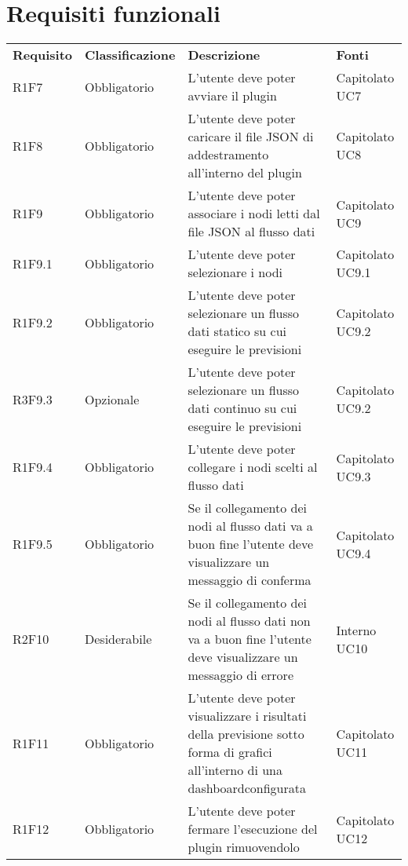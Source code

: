 \section{Requisiti funzionali}
	\begin{longtable} {
		>{}p{24mm} 
		>{}p{32mm}
		>{}p{40mm} 
		>{}p{24.5mm}
		}
	\rowcolor{gray!50}
		\textbf{Requisito} & \textbf{Classificazione} & \textbf{Descrizione} & \textbf{Fonti} 	\TBstrut \\
		
		R1F7 & Obbligatorio & L'utente deve poter avviare il plugin & Capitolato UC7 \TBstrut \\ [2mm]
		R1F8 & Obbligatorio & L'utente deve poter caricare il file JSON di addestramento all'interno del plugin & Capitolato UC8 \TBstrut \\ [2mm]
		R1F9 & Obbligatorio & L'utente deve poter associare i nodi letti dal file JSON al flusso dati & Capitolato UC9 \TBstrut \\ [2mm]
		R1F9.1 & Obbligatorio & L'utente deve poter selezionare i nodi & Capitolato UC9.1 \TBstrut \\ [2mm]
		R1F9.2 & Obbligatorio & L'utente deve poter selezionare un flusso dati statico su cui eseguire le previsioni & Capitolato UC9.2 \TBstrut \\ [2mm]
		R3F9.3 & Opzionale & L'utente deve poter selezionare un flusso dati continuo su cui eseguire le previsioni & Capitolato UC9.2 \TBstrut \\ [2mm]
		R1F9.4 & Obbligatorio & L'utente deve poter collegare i nodi scelti al flusso dati& Capitolato UC9.3 \TBstrut \\ [2mm]
		R1F9.5 & Obbligatorio & Se il collegamento dei nodi al flusso dati va a buon fine l'utente deve visualizzare un messaggio di conferma & Capitolato UC9.4 \TBstrut \\ [2mm]
		R2F10 & Desiderabile & Se il collegamento dei nodi al flusso dati non va a buon fine l'utente deve visualizzare un messaggio di errore & Interno UC10 \TBstrut \\ [2mm]
		R1F11 & Obbligatorio & L'utente deve poter visualizzare i risultati della previsione sotto forma di grafici all'interno di una dashboard\glosp configurata & Capitolato UC11 \TBstrut \\ [2mm]
		R1F12 & Obbligatorio & L'utente deve poter fermare l'esecuzione del plugin rimuovendolo & Capitolato UC12 \TBstrut \\ [2mm]		
	\end{longtable}